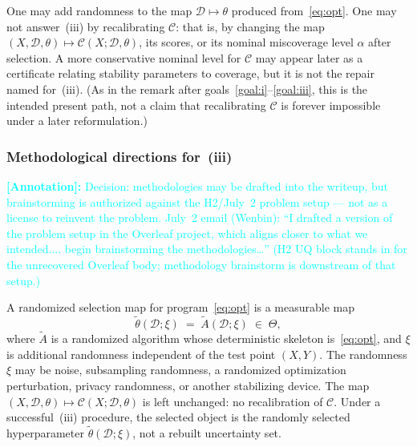 \documentclass[12pt]{article}
\theoremstyle{plain}
\newcommand{\annote}[1]{\textcolor{cyan}{\textbf{[Annotation]:} #1}}
\begin{document}
\label{rem:part-ii-ceiling}
One may add randomness to the map $\mathcal{D}\mapsto\theta$ produced from~\eqref{eq:opt}.
One may not answer~(iii) by recalibrating $\mathcal{C}$: that is, by changing the map $(X,\mathcal{D},\theta)\mapsto\mathcal{C}(X;\mathcal{D},\theta)$, its scores, or its nominal miscoverage level $\alpha$ after selection.
A more conservative nominal level for $\mathcal{C}$ may appear later as a certificate relating stability parameters to coverage, but it is not the repair named for~(iii).
(As in the remark after goals~\ref{goal:i}--\ref{goal:iii}, this is the intended present path, not a claim that recalibrating $\mathcal{C}$ is forever impossible under a later reformulation.)

\subsubsection{Methodological directions for~(iii)}
\label{sec:methods}

\annote{Decision: methodologies may be drafted into the writeup, but brainstorming is authorized against the H2/July~2 problem setup --- not as a license to reinvent the problem.
July~2 email (Wenbin): ``I drafted a version of the problem setup in the Overleaf project, which aligns closer to what we intended.... begin brainstorming the methodologies\ldots''
(H2 UQ block stands in for the unrecovered Overleaf body; methodology brainstorm is downstream of that setup.)}

\label{def:thetatilde}
A randomized selection map for program~\eqref{eq:opt} is a measurable map
\[
\widetilde\theta(\mathcal{D};\xi)
\;=\;
\widetilde A(\mathcal{D};\xi)
\;\in\;
\Theta,
\]
where $\widetilde A$ is a randomized algorithm whose deterministic skeleton is~\eqref{eq:opt}, and $\xi$ is additional randomness independent of the test point $(X,Y)$.
The randomness $\xi$ may be noise, subsampling randomness, a randomized optimization perturbation, privacy randomness, or another stabilizing device.
The map $(X,\mathcal{D},\theta)\mapsto\mathcal{C}(X;\mathcal{D},\theta)$ is left unchanged: no recalibration of $\mathcal{C}$.
Under a successful~(iii) procedure, the selected object is the randomly selected hyperparameter $\widetilde\theta(\mathcal{D};\xi)$, not a rebuilt uncertainty set.
\end{document}
